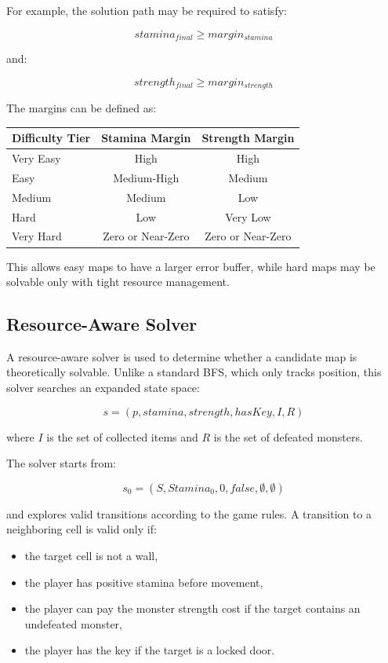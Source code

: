\documentclass[11pt]{article}
\begin{document}
For example, the solution path may be required to satisfy:

\[
stamina_{final} \geq margin_{stamina}
\]

and:

\[
strength_{final} \geq margin_{strength}
\]

The margins can be defined as:

\begin{center}
\begin{tabular}{lcc}
\toprule
Difficulty Tier & Stamina Margin & Strength Margin \\
\midrule
Very Easy & High & High \\
Easy & Medium-High & Medium \\
Medium & Medium & Low \\
Hard & Low & Very Low \\
Very Hard & Zero or Near-Zero & Zero or Near-Zero \\
\bottomrule
\end{tabular}
\end{center}

This allows easy maps to have a larger error buffer, while hard maps may be solvable only with tight resource management.

\subsection{Resource-Aware Solver}

A resource-aware solver is used to determine whether a candidate map is theoretically solvable. Unlike a standard BFS, which only tracks position, this solver searches an expanded state space:

\[
s = (p, stamina, strength, hasKey, I, R)
\]

where $I$ is the set of collected items and $R$ is the set of defeated monsters.

The solver starts from:

\[
s_0 = (S, Stamina_0, 0, false, \emptyset, \emptyset)
\]

and explores valid transitions according to the game rules. A transition to a neighboring cell is valid only if:

\begin{itemize}[noitemsep]
    \item the target cell is not a wall,
    \item the player has positive stamina before movement,
    \item the player can pay the monster strength cost if the target contains an undefeated monster,
    \item the player has the key if the target is a locked door.
\end{itemize}
\end{document}

